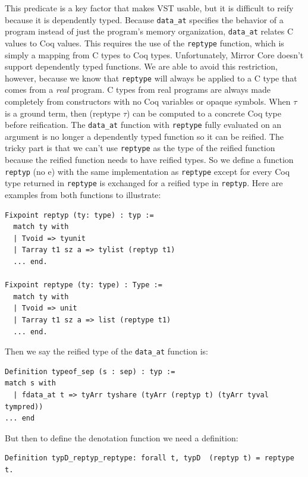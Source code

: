 \documentclass{puthesis}
\begin{document}
This predicate is a key factor that makes VST usable, but it is
difficult to reify because it is dependently typed.
Because \lstinline|data_at| specifies the behavior of a program
instead of just the program's memory organization, \lstinline|data_at|
relates C values to Coq values. This requires the use of the
\lstinline|reptype| function, which is simply a mapping from C types
to Coq types. Unfortunately, Mirror Core doesn't support dependently
typed functions. We are able to avoid this restriction, however,
because we know that \lstinline|reptype| will always be applied to a C
type that comes from a \emph{real} program. C types from real programs
are always made completely from constructors with no Coq variables or
opaque symbols.  When $\tau$ is a ground term, then (reptype $\tau$) can be
computed to a concrete Coq type before reification. The
\lstinline|data_at| function with \lstinline|reptype| fully
evaluated on an argument is no longer a dependently typed function so
it can be reified. The tricky part is that we can't use
\lstinline|reptype| as the type of the reified function because the
reified function needs to have reified types. So we define a function
\lstinline|reptyp| (no e) with the same implementation as
\lstinline|reptype| except for every Coq type returned in
\lstinline|reptype| is exchanged for a reified type in
\lstinline|reptyp|. Here are examples from both functions to
illustrate:

\begin{lstlisting}
Fixpoint reptyp (ty: type) : typ :=
  match ty with
  | Tvoid => tyunit
  | Tarray t1 sz a => tylist (reptyp t1)
  ... end.

Fixpoint reptype (ty: type) : Type :=
  match ty with
  | Tvoid => unit
  | Tarray t1 sz a => list (reptype t1)
  ... end.
\end{lstlisting}

Then we say the reified type of the \lstinline|data_at| function is:

\begin{lstlisting}
Definition typeof_sep (s : sep) : typ :=
match s with
  | fdata_at t => tyArr tyshare (tyArr (reptyp t) (tyArr tyval tympred))
... end
\end{lstlisting}

But then to define the denotation function we need a definition:

\begin{lstlisting}
Definition typD_reptyp_reptype: forall t, typD  (reptyp t) = reptype t.
\end{lstlisting}
\end{document}
